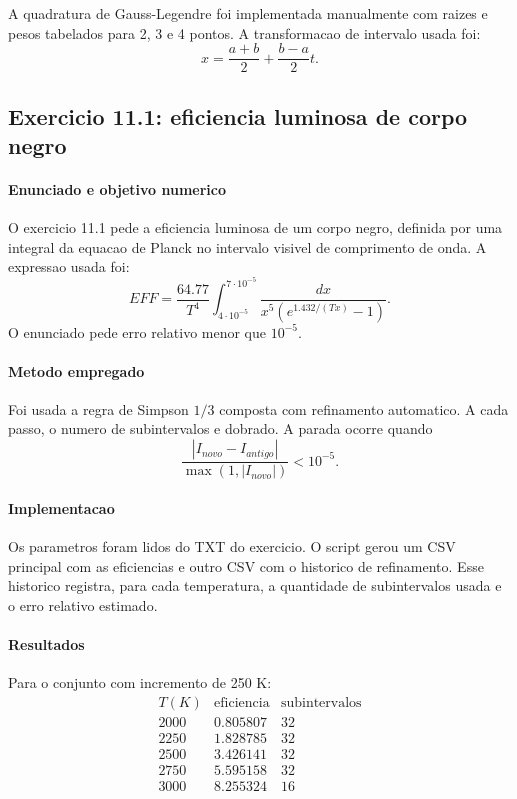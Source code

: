 \documentclass[../main.tex]{subfiles}
\begin{document}
A quadratura de Gauss-Legendre foi implementada manualmente com raizes e pesos
tabelados para 2, 3 e 4 pontos. A transformacao de intervalo usada foi:
\[
    x = \frac{a+b}{2}+\frac{b-a}{2}t.
\]

\subsection{Exercicio 11.1: eficiencia luminosa de corpo negro}

\paragraph{Enunciado e objetivo numerico}
O exercicio 11.1 pede a eficiencia luminosa de um corpo negro, definida por uma
integral da equacao de Planck no intervalo visivel de comprimento de onda. A
expressao usada foi:
\[
    EFF =
    \frac{64.77}{T^4}
    \int_{4\cdot10^{-5}}^{7\cdot10^{-5}}
    \frac{dx}{x^5\left(e^{1.432/(Tx)}-1\right)}.
\]
O enunciado pede erro relativo menor que \(10^{-5}\).

\paragraph{Metodo empregado}
Foi usada a regra de Simpson \(1/3\) composta com refinamento automatico. A cada
passo, o numero de subintervalos e dobrado. A parada ocorre quando
\[
    \frac{|I_{novo}-I_{antigo}|}{\max(1,|I_{novo}|)} < 10^{-5}.
\]

\paragraph{Implementacao}
Os parametros foram lidos do TXT do exercicio. O script gerou um CSV principal
com as eficiencias e outro CSV com o historico de refinamento. Esse historico
registra, para cada temperatura, a quantidade de subintervalos usada e o erro
relativo estimado.

\paragraph{Resultados}
Para o conjunto com incremento de 250 K:
\[
\begin{array}{c|c|c}
T(K) & \text{eficiencia} & \text{subintervalos} \\
\hline
2000 & 0.805807 & 32 \\
2250 & 1.828785 & 32 \\
2500 & 3.426141 & 32 \\
2750 & 5.595158 & 32 \\
3000 & 8.255324 & 16
\end{array}
\]
\end{document}
